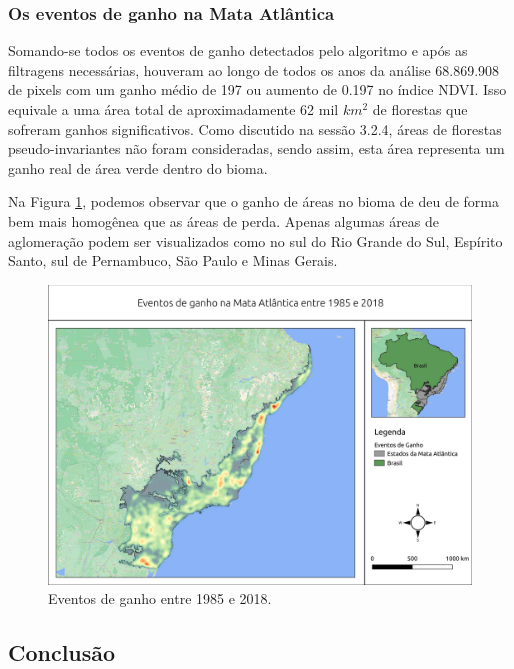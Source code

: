 \subsubsection{Os eventos de ganho na Mata Atlântica}

\hspace{13pt} Somando-se todos os eventos de ganho detectados pelo algoritmo e após as filtragens necessárias, houveram ao longo de todos os anos da análise 68.869.908 de pixels com um ganho médio de 197 ou aumento de 0.197 no índice NDVI. Isso equivale a uma área total de aproximadamente 62 mil $ km^2 $ de florestas que sofreram ganhos significativos. Como discutido na sessão 3.2.4, áreas de florestas pseudo-invariantes não foram consideradas, sendo assim, esta área representa um ganho real de área verde dentro do bioma. 

Na Figura \ref{fig:heat_gain}, podemos observar que o ganho de áreas no bioma de deu de forma bem mais homogênea que as áreas de perda. Apenas algumas áreas de aglomeração podem ser visualizados como no sul do Rio Grande do Sul, Espírito Santo, sul de Pernambuco, São Paulo e Minas Gerais.

\begin{figure}[H]
    \centering
    \includegraphics[scale=.5]{images/heatmap_gain_masked18_dur_gt4_inv_for.pdf}
    \caption{Eventos de ganho entre 1985 e 2018.}
    \label{fig:heat_gain}
\end{figure}

\subsection{Conclusão}

